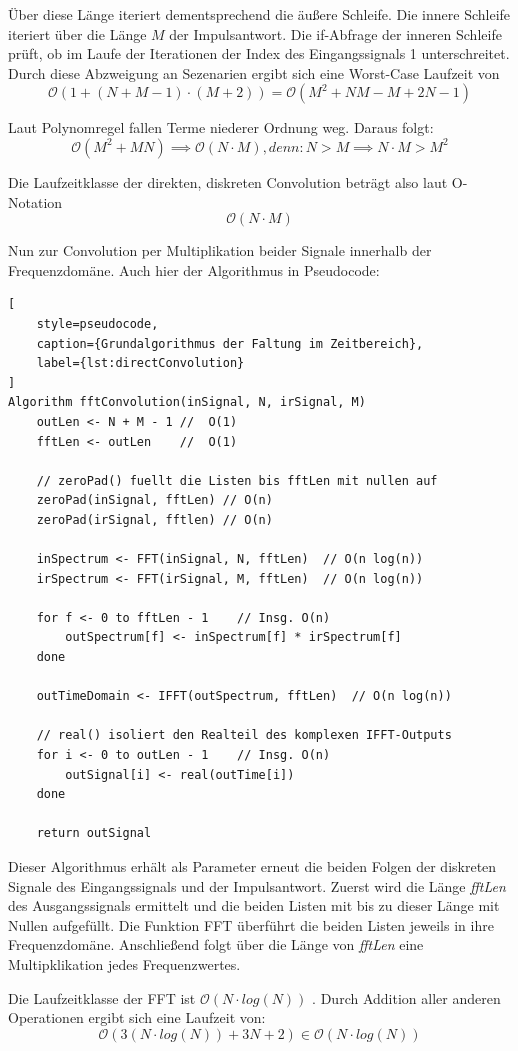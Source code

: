 Über diese Länge iteriert dementsprechend die äußere Schleife.
Die innere Schleife iteriert über die Länge $M$ der Impulsantwort.
Die if-Abfrage der inneren Schleife prüft, ob im Laufe der Iterationen
der Index des Eingangssignals 1 unterschreitet.
Durch diese Abzweigung an Sezenarien ergibt sich eine Worst-Case Laufzeit von
\begin{equation}
\mathcal{O}(1 + (N + M - 1) \cdot (M + 2)) = \mathcal{O}(M^2 + NM - M + 2N - 1)
\end{equation}

Laut Polynomregel fallen Terme niederer Ordnung weg. Daraus folgt:
\begin{equation}
    \mathcal{O}(M^2 + MN) \implies \mathcal{O}(N \cdot M)
     , denn: N > M \implies N \cdot M > M^2
\end{equation}

Die Laufzeitklasse der direkten, diskreten Convolution beträgt also laut O-Notation
\begin{equation}
\mathcal{O}(N \cdot M)
\end{equation}

Nun zur Convolution per Multiplikation beider Signale innerhalb der Frequenzdomäne.
Auch hier der Algorithmus in Pseudocode:

\begin{lstlisting}[
    style=pseudocode,
    caption={Grundalgorithmus der Faltung im Zeitbereich},
    label={lst:directConvolution}
]
Algorithm fftConvolution(inSignal, N, irSignal, M)
    outLen <- N + M - 1 //  O(1)
    fftLen <- outLen    //  O(1)

    // zeroPad() fuellt die Listen bis fftLen mit nullen auf
    zeroPad(inSignal, fftLen) // O(n)
    zeroPad(irSignal, fftlen) // O(n)

    inSpectrum <- FFT(inSignal, N, fftLen)  // O(n log(n))
    irSpectrum <- FFT(irSignal, M, fftLen)  // O(n log(n))

    for f <- 0 to fftLen - 1    // Insg. O(n)
        outSpectrum[f] <- inSpectrum[f] * irSpectrum[f]
    done

    outTimeDomain <- IFFT(outSpectrum, fftLen)  // O(n log(n))

    // real() isoliert den Realteil des komplexen IFFT-Outputs
    for i <- 0 to outLen - 1    // Insg. O(n)
        outSignal[i] <- real(outTime[i])
    done

    return outSignal
\end{lstlisting}

Dieser Algorithmus erhält als Parameter erneut die beiden Folgen der diskreten Signale
des Eingangssignals und der Impulsantwort.
Zuerst wird die Länge \textit{fftLen} des Ausgangssignals ermittelt und die beiden Listen mit bis zu
dieser Länge mit Nullen aufgefüllt.
Die Funktion FFT überführt die beiden Listen jeweils in ihre Frequenzdomäne.
Anschließend folgt über die Länge von \textit{fftLen} eine Multipklikation jedes Frequenzwertes.

Die Laufzeitklasse der FFT ist $\mathcal{O}(N \cdot log(N))$ \cite[Kap. 12] {smith1997}. Durch Addition aller anderen
Operationen ergibt sich eine Laufzeit von:
\begin{equation}
    \mathcal{O}(3(N \cdot log(N)) + 3N + 2) \in \mathcal{O}(N \cdot log(N))
\end{equation}